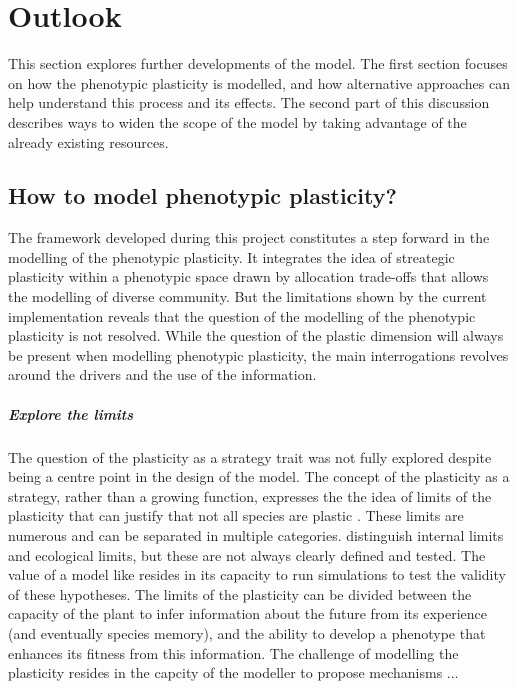 

\chapter{Outlook}

This section explores further developments of the model. The first section focuses on how the phenotypic plasticity is modelled, and how alternative approaches can help understand this process and its effects. The second part of this discussion describes ways to widen the scope of the model by taking advantage of the already existing resources.

\section{How to model phenotypic plasticity? }

The framework developed during this project constitutes a step forward in the modelling of the phenotypic plasticity. It integrates the idea of streategic plasticity \parencite{bradshaw_evolutionary_1965, dewitt_expanding_2016} within a phenotypic space drawn by allocation trade-offs that allows the modelling of diverse community. But the limitations shown by the current implementation reveals that the question of the modelling of the phenotypic plasticity is not resolved. While the question of the plastic dimension will always be present when modelling phenotypic plasticity, the main interrogations revolves around the drivers and the use of the information. 


\paragraph{Explore the limits}

The question of the plasticity as a strategy trait was not fully explored despite being a centre point in the design of the model. The concept of the plasticity as a strategy, rather than a growing function, expresses the the idea of limits of the plasticity that can justify that not all species are plastic \parencite{dewitt_costs_1998 ,  van_kleunen_constraints_2005, valladares_ecological_2007, auld_re-evaluationg_2009}. These limits are numerous and can be separated in multiple categories.\cite{valladares_ecological_2007} distinguish internal limits and ecological limits, but these are not always clearly defined and tested. The value of a model like \model resides in its capacity to run simulations to test the validity of these hypotheses. The limits of the plasticity can be divided between the capacity of the plant to infer information about the future from its experience (and eventually species memory), and the ability to develop a phenotype that enhances its fitness from this information. The challenge of modelling the plasticity resides in the capcity of the modeller to propose mechanisms ... %

